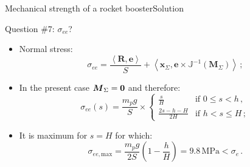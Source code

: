 \documentclass{beamer}
\newcommand{\xj}{x}
\newcommand{\xv}{{\boldsymbol\xj}}
\newcommand{\ej}{e}
\newcommand{\ev}{{\boldsymbol\ej}}
\newcommand*{\Mstaticj}{J}
\newcommand*{\Mstatic}{{\mathbb\Mstaticj}}
\newcommand*{\stressj}{\sigma}
\newcommand{\Fresj}{R}
\newcommand{\Mresj}{M}
\newcommand{\Fres}{{\boldsymbol\Fresj}}
\newcommand{\Mres}{{\boldsymbol\Mresj}}
\newcommand{\bzero}{{\bf 0}}
\newcommand{\scal}[1]{\left\langle{#1}\right\rangle}
\begin{document}
\begin{frame}{Mechanical strength of a rocket booster}{Solution}
\begin{overprint}
\vskip-20pt
\begin{exampleblock}{Question \#7: $\stressj_{ee}$?}
\begin{itemize}
\item Normal stress:
\begin{displaymath}
\stressj_{ee}=\frac{\scal{\Fres,\ev}}{S}+\scal{\xv_\Sigma,\ev\times\Mstatic^{-1}(\Mres_\Sigma)}\,;
\end{displaymath}
\item In the present case $\Mres_\Sigma=\bzero$ and therefore:
\begin{displaymath}
\stressj_{ee}(s)=\frac{m_pg}{S}\times\left\{\begin{array}{ll}
\displaystyle \frac{s}{H} & \text{if $0\leq s< h$}\,, \\
\displaystyle \frac{2s-h-H}{2H} & \text{if $h< s\leq H$}\,;
\end{array}\right.
\end{displaymath}
\item It is maximum for $s=H$ for which:
\begin{displaymath}
\stressj_{ee,\text{max}}= \frac{m_pg}{2S}\left(1-\frac{h}{H}\right)=9.8\,\text{MPa}<\stressj_e\,.
\end{displaymath}
\end{itemize}
\end{exampleblock}

\end{overprint}

\end{frame}
\end{document}
